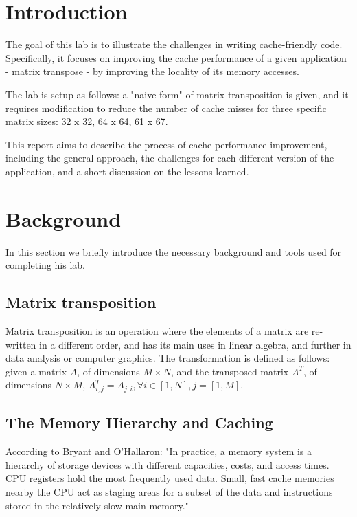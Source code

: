 \documentclass[11pt]{article}
\begin{document}
\section{Introduction}
The goal of this lab is to illustrate the challenges in writing cache-friendly code. Specifically, it focuses on improving the cache performance of a given application - matrix transpose - by improving the locality of its memory accesses. 

The lab is setup as follows: a "naive form" of matrix transposition is given, and it requires modification to reduce the number of cache misses for three specific matrix sizes: 32 x 32, 64 x 64, 61 x 67.  

This report aims to describe the process of cache performance improvement, including the general approach, the challenges for each different version of the application, and a short discussion on the lessons learned.  

\section{Background} \label{sec:background}
In this section we briefly introduce the necessary background and tools used for completing his lab. 

\subsection*{Matrix transposition} 
Matrix transposition is an operation where the elements of a matrix are re-written in a different order, and has its main uses in linear algebra, and further in data analysis or computer graphics. The transformation is defined as follows: given a matrix $A$, of dimensions $M \times N$, and the transposed matrix $A^T$, of dimensions $N \times M$, $A^T_{i,j} = A_{j,i}, \forall i \in [1,N], j=[1,M]$. 

\subsection*{The Memory Hierarchy and Caching}
According to Bryant and O'Hallaron: "In practice, a memory system is a hierarchy of storage devices with different capacities, costs, and access times. CPU registers hold the most frequently used data. Small, fast cache memories nearby the CPU act as staging areas for a subset of the data and instructions stored in the relatively slow main memory." 
\end{document}
